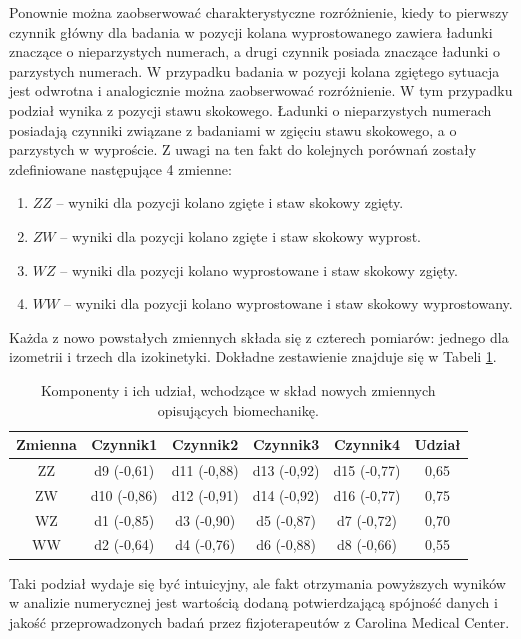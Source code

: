 Ponownie można zaobserwować charakterystyczne rozróżnienie, kiedy to pierwszy czynnik główny dla badania w pozycji kolana wyprostowanego zawiera ładunki znaczące o nieparzystych numerach, a drugi czynnik posiada znaczące ładunki o parzystych numerach. W przypadku badania w pozycji kolana zgiętego sytuacja jest odwrotna i analogicznie można zaobserwować rozróżnienie. W tym przypadku podział wynika z pozycji stawu skokowego. Ładunki o nieparzystych numerach posiadają czynniki związane z badaniami w zgięciu stawu skokowego, a o parzystych w wyproście. Z uwagi na ten fakt do kolejnych porównań zostały zdefiniowane następujące 4 zmienne:
\begin{enumerate}
	\item $ZZ$ -- wyniki dla pozycji kolano zgięte i staw skokowy zgięty.
	\item $ZW$ -- wyniki dla pozycji kolano zgięte i staw skokowy wyprost.
	\item $WZ$ -- wyniki dla pozycji kolano wyprostowane i staw skokowy zgięty.
	\item $WW$ -- wyniki dla pozycji kolano wyprostowane i staw skokowy wyprostowany.
\end{enumerate} 

Każda z nowo powstałych zmiennych składa się z czterech pomiarów: jednego dla izometrii i trzech dla izokinetyki. Dokładne zestawienie znajduje się w Tabeli \ref{tab:bio-new-factors}.

\begin{table}[h]
	\centering
	\setlength{\tabcolsep}{3pt}
	\setlength\extrarowheight{2pt}
	\caption{Komponenty i ich udział, wchodzące w skład nowych zmiennych opisujących biomechanikę.}
	\label{tab:bio-new-factors}
	\begin{tabular}{c|c|c|c|c|c}
		Zmienna&Czynnik1&Czynnik2&Czynnik3&Czynnik4&Udział \\
		\hline
		ZZ&d9 (-0,61)&d11 (-0,88)&d13 (-0,92)&d15 (-0,77)&0,65\\
		\hline
		ZW&d10 (-0,86)&d12 (-0,91)&d14 (-0,92)&d16 (-0,77)&0,75\\
		\hline
		WZ&d1 (-0,85)&d3 (-0,90)&d5 (-0,87)&d7 (-0,72)&0,70\\
		\hline
		WW&d2 (-0,64)&d4 (-0,76)&d6 (-0,88)&d8 (-0,66)&0,55\\
		\hline
			
	\end{tabular}
\end{table}

Taki podział wydaje się być intuicyjny, ale fakt otrzymania powyższych wyników w analizie numerycznej jest wartością dodaną potwierdzającą spójność danych i jakość przeprowadzonych badań przez fizjoterapeutów z Carolina Medical Center. 

